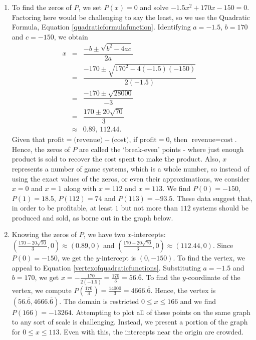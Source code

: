 \begin{ex}
\begin{enumerate}
\item  To find the zeros of $P$, we set $P(x) = 0$ and solve  $-1.5x^2+170x-150=0$. Factoring here would be challenging to say the least, so we use the Quadratic Formula,  Equation \ref{quadraticformulafunction}.  Identifying $a = -1.5$, $b=170$ and $c=-150$, we obtain\[ \begin{array}{rclr}

 x & = & \dfrac{-b \pm \sqrt{b^2-4ac}}{2a} & \\ [10pt]
   & = & \dfrac{-170 \pm \sqrt{170^2 - 4(-1.5)(-150)}}{2(-1.5)} & \\ [10pt]
	 & = & \dfrac{-170 \pm \sqrt{28000}}{-3} & \\ [10pt]
	 & = & \dfrac{170 \pm 20 \sqrt{70}}{3} & \\ [10pt]
	 & \approx & 0.89, \, 112.44. \end{array}\] Given that $\text{profit} = \text{(revenue)} - \text{(cost)}$, if $\text{profit} = 0$, then $\text{revenue} = \text{cost}$.  Hence, the zeros of $P$ are called the `break-even' points - where just enough product is sold to recover the cost spent to make the product. Also, $x$ represents a number of game systems, which is a whole number, so instead of using the exact values of the zeros, or even their approximations, we consider $x = 0$ and $x = 1$ along with $x = 112$ and $x=113$. We find $P(0) = -150$, $P(1) = 18.5$, $P(112) = 74$ and $P(113)= -93.5$.  These data suggest that, in order to be profitable, at least $1$ but not more than $112$ systems should be produced and sold, as borne out in the graph below.

\item Knowing the zeros of $P$, we have two $x$-intercepts: $\left( \frac{170 - 20 \sqrt{70}}{3},0\right) \approx (0.89,0)$ and $\left( \frac{170 + 20 \sqrt{70}}{3},0\right) \approx (112.44,0)$.  Since $P(0)=-150$, we get the  $y$-intercept is $(0,-150)$.  To find the vertex, we appeal to Equation \ref{vertexofquadraticfunctions}.  Substituting $a = -1.5$ and $b=170$, we get $x = -\frac{170}{2(-1.5)} = \frac{170}{3} = 56.\overline{6}$.  To find the $y$-coordinate of the vertex, we compute $P\left( \frac{170}{3} \right) = \frac{14000}{3} = 4666.\overline{6}$.  Hence, the vertex is $(56.\overline{6}, 4666.\overline{6})$.  The domain is restricted $0 \leq x \leq 166$ and we find $P(166) = -13264$.  Attempting to plot all of these points on the same graph to any sort of scale is challenging.  Instead, we present a portion of the graph for  $0 \leq x \leq 113$.  Even with this, the intercepts near the origin are crowded.


\end{enumerate}
\end{ex}
